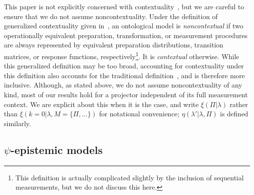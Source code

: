 \documentclass[%
 reprint,
superscriptaddress,
nofootinbib,
 amsmath,amssymb,
 prx, 
 accepted=2019-09-27,
]{quantumarticle}
\begin{document}
This paper is not explicitly concerned with
contextuality~\cite{KochenProblemHiddenVariables1967,SpekkensContextualitypreparationstransformations2005},
but we are careful to ensure that we do not assume
noncontextuality. Under the definition of generalized contextuality
given in~\cite{SpekkensContextualitypreparationstransformations2005},
an ontological model is \emph{noncontextual} if two operationally
equivalent preparation, transformation, or measurement procedures are
always represented by equivalent preparation distributions, transition
matrices, or response functions, respectively\footnote{This definition
  is actually complicated slightly by the inclusion of sequential
  measurements, but we do not discuss this here.}. It is
\emph{contextual} otherwise. While this generalized definition may be
too broad, accounting for contextuality under this definition also
accounts for the traditional
definition~\cite{KochenProblemHiddenVariables1967}, and is therefore
more inclusive. Although, as stated above, we do not assume
noncontextuality of any kind, most of our results hold for a projector
independent of its full measurement context. We are explicit about
this when it is the case, and write $\xi(\Pi|\lambda)$ rather than
$\xi(k=0|\lambda,M=\{\Pi,\ldots\})$ for notational convenience;
$\eta(\lambda'|\lambda,\Pi)$ is defined similarly.



\subsection{$\psi$-epistemic models}
\label{sec:psi-epistemic-models}
\end{document}
